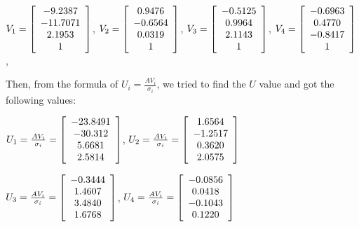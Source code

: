 \documentclass[]{article}
\begin{document}
\centerline {
	$V_1 = \left[ {\begin{array}{*{20}c}
		-9.2387 \\
		-11.7071 \\ 
		2.1953 \\
		1  
		\end{array} } \right]$, 
	$V_2 = \left[ {\begin{array}{*{20}c}
		0.9476 \\
		-0.6564 \\ 
		0.0319 \\
		1  
		\end{array} } \right]$, 
	$V_3 = \left[ {\begin{array}{*{20}c}
		-0.5125 \\
		0.9964 \\ 
		2.1143 \\
		1  
		\end{array} } \right]$,
	$V_4 = \left[ {\begin{array}{*{20}c}
		-0.6963 \\
		0.4770 \\ 
		-0.8417 \\
		1  
		\end{array} } \right]$,  
}

\vspace{1.0em}

Then, from the formula of $U_i = \frac{AV_i}{\sigma _i}$, we tried to find the $U$ value and got the following values:

\centerline  {
	$U_1 = \frac{AV_i}{\sigma _i} = \left[ {\begin{array}{*{20}c}
		-23.8491 \\
		-30.312 \\ 
		5.6681 \\
		2.5814  
		\end{array} } \right] $, 	$U_2 = \frac{AV_i}{\sigma _i} = \left[ {\begin{array}{*{20}c}
		1.6564 \\
		-1.2517 \\ 
		0.3620 \\
		2.0575  
		\end{array} } \right] $
}

\vspace{1.0em}

\centerline {
	$U_3 = \frac{AV_i}{\sigma _i} = \left[ {\begin{array}{*{20}c}
		-0.3444 \\
		1.4607 \\ 
		3.4840 \\
		1.6768  
		\end{array} } \right] $, 	$U_4 = \frac{AV_i}{\sigma _i} = \left[ {\begin{array}{*{20}c}
		-0.0856 \\
		0.0418 \\ 
		-0.1043 \\
		0.1220  
		\end{array} } \right] $
}
\end{document}
